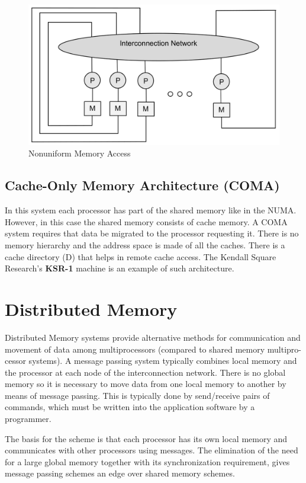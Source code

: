 \documentclass[11pt]{article}
\begin{document}
\begin{figure}[htp]
\centering
\includegraphics[scale=0.20]{numa.png}
\caption{Nonuniform Memory Access}
\end{figure}


\subsection{Cache-Only Memory Architecture (COMA)}
In this system each processor has part of the shared memory like in the NUMA.
However, in this case the shared memory consists of cache memory. A COMA
system requires that data be migrated to the processor requesting it. There is no memory hierarchy and the address space is made of all the caches. There is a cache directory (D) that helps in remote cache access. The Kendall Square Research’s \textbf{KSR-1} machine is an example of such architecture.



\section{Distributed Memory}
Distributed Memory systems provide alternative methods for communication and
movement of data among multiprocessors (compared to shared memory multipro-
cessor systems). A message passing system typically combines local memory and
the processor at each node of the interconnection network. There is no global
memory so it is necessary to move data from one local memory to another by
means of message passing. This is typically done by send/receive pairs of
commands, which must be written into the application software by a programmer.

The basis for the scheme is that
each processor has its own local memory and communicates with other processors
using messages. The elimination of the need for a large global memory together with its synchronization requirement, gives message passing schemes an edge over shared memory schemes.
\end{document}
